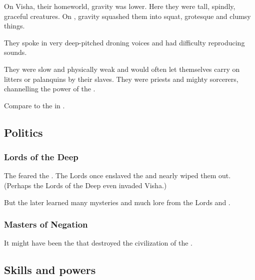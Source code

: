 On Visha, their homeworld, gravity was lower.
Here they were tall, spindly, graceful creatures.
On \Miith, gravity squashed them into squat, grotesque and clumsy things. 

They spoke in very deep-pitched droning voices and had difficulty reproducing \humanoid sounds.

They were slow and physically weak and would often let themselves carry on litters or palanquins by their \glithid slaves. 
They were priests and mighty sorcerers, channelling the power of the \moongods.

Compare to the  in \cite[p.444]{HPLovecraft:TheDreamQuestofUnknownKadath}.









\subsection{Politics}





\subsubsection{Lords of the Deep}
The \shugul feared the .
The Lords once enslaved the \shugul and nearly wiped them out. 
(Perhaps the Lords of the Deep even invaded Visha.) 

But the \shugul later learned many mysteries and much lore from the Lords and .





\subsubsection{Masters of Negation}
It might have been the  that destroyed the civilization of the \shugul.









\subsection{Skills and powers}





